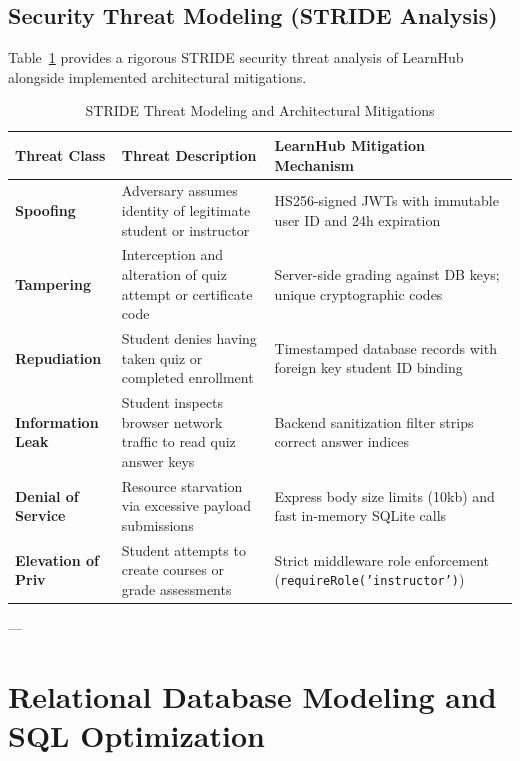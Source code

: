 \documentclass[12pt,a4paper]{report}
\begin{document}
\section{Security Threat Modeling (STRIDE Analysis)}
Table~\ref{tab:stride} provides a rigorous STRIDE security threat analysis of LearnHub alongside implemented architectural mitigations.

\begin{table}[H]
\centering
\caption{STRIDE Threat Modeling and Architectural Mitigations}
\label{tab:stride}
\begin{tabularx}{\textwidth}{@{}lXl@{}}
\toprule
\textbf{Threat Class} & \textbf{Threat Description} & \textbf{LearnHub Mitigation Mechanism} \\ \midrule
\textbf{Spoofing} & Adversary assumes identity of legitimate student or instructor & HS256-signed JWTs with immutable user ID and 24h expiration \\
\textbf{Tampering} & Interception and alteration of quiz attempt or certificate code & Server-side grading against DB keys; unique cryptographic codes \\
\textbf{Repudiation} & Student denies having taken quiz or completed enrollment & Timestamped database records with foreign key student ID binding \\
\textbf{Information Leak} & Student inspects browser network traffic to read quiz answer keys & Backend sanitization filter strips correct answer indices \\
\textbf{Denial of Service} & Resource starvation via excessive payload submissions & Express body size limits (10kb) and fast in-memory SQLite calls \\
\textbf{Elevation of Priv} & Student attempts to create courses or grade assessments & Strict middleware role enforcement (\texttt{requireRole('instructor')}) \\ \bottomrule
\end{tabularx}
\end{table}

---

\chapter{Relational Database Modeling and SQL Optimization}
\end{document}
